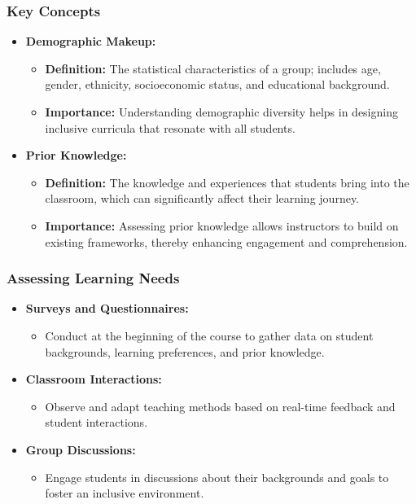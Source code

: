 \documentclass[aspectratio=169]{beamer}
\begin{document}
\begin{frame}[fragile]
    \frametitle{Key Concepts}
    \begin{itemize}
        \item \textbf{Demographic Makeup:}
            \begin{itemize}
                \item \textbf{Definition:} The statistical characteristics of a group; includes age, gender, ethnicity, socioeconomic status, and educational background.
                \item \textbf{Importance:} Understanding demographic diversity helps in designing inclusive curricula that resonate with all students.
            \end{itemize}
        \item \textbf{Prior Knowledge:}
            \begin{itemize}
                \item \textbf{Definition:} The knowledge and experiences that students bring into the classroom, which can significantly affect their learning journey.
                \item \textbf{Importance:} Assessing prior knowledge allows instructors to build on existing frameworks, thereby enhancing engagement and comprehension.
            \end{itemize}
    \end{itemize}
\end{frame}

\begin{frame}[fragile]
    \frametitle{Assessing Learning Needs}
    \begin{itemize}
        \item \textbf{Surveys and Questionnaires:} 
            \begin{itemize}
                \item Conduct at the beginning of the course to gather data on student backgrounds, learning preferences, and prior knowledge.
            \end{itemize}
        \item \textbf{Classroom Interactions:}
            \begin{itemize}
                \item Observe and adapt teaching methods based on real-time feedback and student interactions.
            \end{itemize}
        \item \textbf{Group Discussions:} 
            \begin{itemize}
                \item Engage students in discussions about their backgrounds and goals to foster an inclusive environment.
            \end{itemize}
    \end{itemize}
\end{frame}
\end{document}
